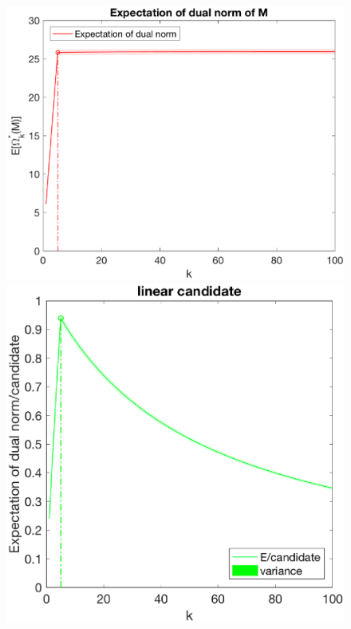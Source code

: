 \documentclass[12pt]{article}
\begin{document}

\begin{figure}[h]
    \begin{minipage}[c]{.3\linewidth}
        \centering
        \includegraphics[width=\linewidth]{Fig/dualnorm-u0ones-k0-5.eps}
    \end{minipage}
    \hfill%
    \begin{minipage}[c]{.3\linewidth}
        \centering
        \includegraphics[width=\linewidth]{Fig/dualnorm-u0ones-k0-5-candidatelin.eps}

\end{minipage}
\end{figure}
\end{document}
